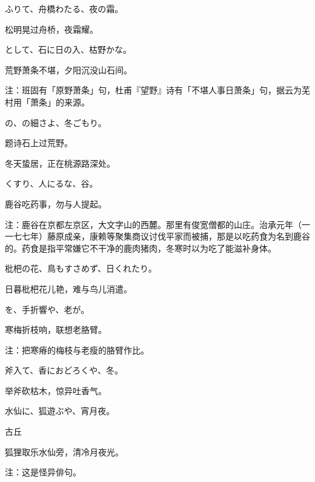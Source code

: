 \begin{haiku}
    {\FH {}ふりて、舟橋わたる、夜の霜。}

    {\FK 松明晃过舟桥，夜霜耀。}
\end{haiku}

\begin{haiku}
    {\FH {}として、石に日の入、枯野かな。}

    {\FK 荒野萧条不堪，夕阳沉没山石间。}

    {\FT 注：班固有「原野萧条」句，杜甫『望野』诗有「不堪人事日萧条」句，据云为芜村用「萧条」的来源。}
\end{haiku}

\begin{haiku}
    {\FH {}の、の細さよ、冬ごもり。}

    {\FK 题诗石上过荒野。}

    {\FK 冬天蛰居，正在桃源路深处。}
\end{haiku}

\begin{haiku}
    {\FH くすり、人にるな、谷。}

    {\FK 鹿谷吃药事，勿与人提起。}

    {\FT 注：鹿谷在京都左京区，大文字山的西麓。那里有俊宽僧都的山庄。治承元年（一一七七年）藤原成亲，康赖等聚集商议讨伐平家而被捕，那是以吃药食为名到鹿谷的。药食是指平常嫌它不干净的鹿肉猪肉，冬寒时以为吃了能滋补身体。}
\end{haiku}

\begin{haiku}
    {\FH 枇杷の花、鳥もすさめず、日くれたり。}

    {\FK 日暮枇杷花儿艳，难与鸟儿消遣。}
\end{haiku}

\begin{haiku}
    {\FH {}を、手折響や、老が。}

    {\FK 寒梅折枝响，联想老胳臂。}

    {\FT 注：把寒瘠的梅枝与老瘦的胳臂作比。}
\end{haiku}

\begin{haiku}
    {\FH 斧入て、香におどろくや、冬。}

    {\FK 举斧砍枯木，惊异吐香气。}
\end{haiku}

\begin{haiku}
    {\FH 水仙に、狐遊ぶや、宵月夜。}

    {\FK 古丘}

    {\FK 狐狸取乐水仙旁，清冷月夜光。}

    {\FT 注：这是怪异俳句。}
\end{haiku}

